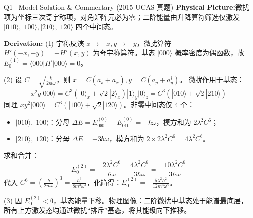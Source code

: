 \documentclass[a4paper,11pt]{article}
\begin{document}
\vspace{4pt}

\begin{solution}{Q1 \textperiodcentered\ Model Solution \& Commentary (2015 UCAS 真题)}
\textbf{Physical Picture:}\enspace 微扰项为坐标三次奇宇称项，对角矩阵元必为零；二阶能量由升降算符筛选仅激发 $|010\rangle, |100\rangle, |210\rangle, |120\rangle$ 四个中间态。

\vspace{1.5mm}
\textbf{Derivation:}\enspace
(1) 宇称反演 $x \to -x, y \to -y$，微扰算符 $H'(-x,-y) = -H'(x,y)$ 为奇宇称算符。基态 $|000\rangle$ 概率密度为偶函数，故 $E_0^{(1)} = \langle 000|H'|000\rangle = 0$。

(2) 设 $C = \sqrt{\frac{\hbar}{2m\omega}}$，则 $x = C(a_x+a_x^\dagger), y = C(a_y+a_y^\dagger)$。
微扰作用于基态：
\[
  x^2 y |000\rangle = C^3 (|0\rangle_x + \sqrt{2}|2\rangle_x)|1\rangle_y |0\rangle_z = C^3 (|010\rangle + \sqrt{2}|210\rangle)
\]
同理 $x y^2 |000\rangle = C^3 (|100\rangle + \sqrt{2}|120\rangle)$。非零中间态仅 4 个：
\begin{itemize}[leftmargin=1.5em, itemsep=1pt, topsep=1pt]
  \item $|010\rangle, |100\rangle$：分母 $\Delta E = E_{000}^{(0)} - E_{010}^{(0)} = -\hbar\omega$，模方和为 $2 \lambda^2 C^6$；
  \item $|210\rangle, |120\rangle$：分母 $\Delta E = -3\hbar\omega$，模方和为 $2 \times 2\lambda^2 C^6 = 4\lambda^2 C^6$。
\end{itemize}
求和合并：
\[
  E_0^{(2)} = -\frac{2\lambda^2 C^6}{\hbar\omega} - \frac{4\lambda^2 C^6}{3\hbar\omega} = -\frac{10\lambda^2 C^6}{3\hbar\omega}
\]
代入 $C^6 = \left(\frac{\hbar}{2m\omega}\right)^3 = \frac{\hbar^3}{8m^3\omega^3}$，化简得：$E_0^{(2)} = -\frac{5\lambda^2 \hbar^2}{12 m^3 \omega^4}$。

(3) 因 $E_0^{(2)} < 0$，基态能量下移。物理图像：二阶微扰中基态处于能谱最底层，所有上方激发态均通过微扰“排斥”基态，将其能级向下推移。
\end{solution}

\vspace{4pt}
\end{document}

